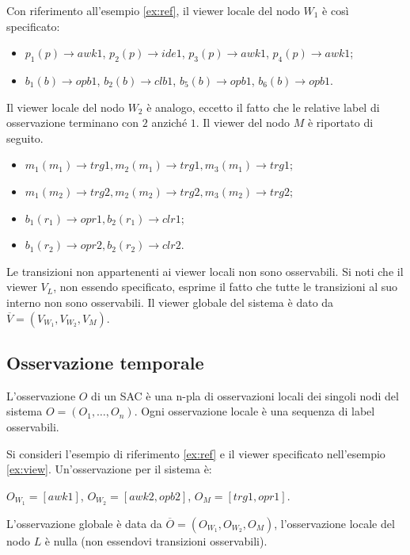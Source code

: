 \begin{ex} \label{ex:view}
Con riferimento all'esempio \ref{ex:ref}, il viewer locale del nodo $W_1$ è così specificato:
\begin{itemize}
\item $p_1(p) \rightarrow awk1$, $p_2(p) \rightarrow ide1$, $p_3(p) \rightarrow awk1$, $p_4(p) \rightarrow awk1$;
\item $b_1(b) \rightarrow opb1$, $b_2(b) \rightarrow clb1$, $b_5(b) \rightarrow opb1$, $b_6(b) \rightarrow opb1$.
\end{itemize}
Il viewer locale del nodo $W_2$ è analogo, eccetto il fatto che le relative label di osservazione terminano con $2$ anziché $1$.
Il viewer del nodo $M$ è riportato di seguito.
\begin{itemize}
\item $m_1(m_1) \rightarrow trg1, m_2(m_1) \rightarrow trg1, m_3(m_1) \rightarrow trg1$;
\item $m_1(m_2) \rightarrow trg2, m_2(m_2) \rightarrow trg2, m_3(m_2) \rightarrow trg2$;
\item $b_1(r_1) \rightarrow opr1, b_2(r_1) \rightarrow clr1$;
\item $b_1(r_2) \rightarrow opr2, b_2(r_2) \rightarrow clr2$.
\end{itemize}
Le transizioni non appartenenti ai viewer locali non sono osservabili. Si noti che il viewer $V_L$, non essendo specificato, esprime il fatto che tutte le transizioni al suo interno non sono osservabili.
Il viewer globale del sistema è dato da $\overline{V} = (V_{W_1},V_{W_2},V_M)$.
\end{ex}

\subsection{Osservazione temporale}
L'osservazione $O$ di un SAC è una n-pla di osservazioni locali dei singoli nodi del sistema $O = (O_1, \ldots, O_n)$. Ogni osservazione locale è una sequenza di label osservabili.

\begin{ex} \label{ex_osserv}
Si consideri l'esempio di riferimento \ref{ex:ref} e il viewer specificato nell'esempio \ref{ex:view}. Un'osservazione per il sistema è:
\begin{center}
$O_{W_1} = [awk1]$, $O_{W_2} = [awk2,opb2]$, $O_M = [trg1,opr1]$. 
\end{center}
L'osservazione globale è data da $\overline{O} = (O_{W_1}, O_{W_2}, O_M)$, l'osservazione locale del nodo $L$ è nulla (non essendovi transizioni osservabili).
\end{ex}

